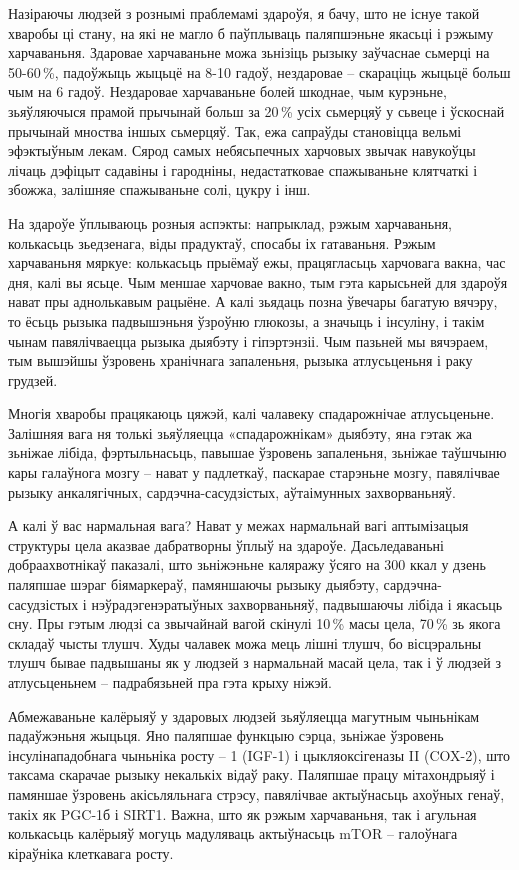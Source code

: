 Назіраючы людзей з рознымі праблемамі здароўя, я бачу, што не існуе такой хваробы ці стану, на які не магло б паўплываць паляпшэньне якасьці і рэжыму харчаваньня. Здаровае харчаваньне можа зьнізіць рызыку заўчаснае сьмерці на 50-60\,\%, падоўжыць жыцьцё на 8-10 гадоў, нездаровае – скараціць жыцьцё больш чым на 6 гадоў. Нездаровае харчаваньне болей шкоднае, чым курэньне, зьяўляючыся прамой прычынай больш за 20\,\% усіх сьмерцяў у сьвеце і ўскоснай прычынай мноства іншых сьмерцяў. Так, ежа сапраўды становіцца вельмі эфэктыўным лекам. Сярод самых небясьпечных харчовых звычак навукоўцы лічаць дэфіцыт садавіны і гародніны, недастатковае спажываньне клятчаткі і збожжа, залішняе спажываньне солі, цукру і інш.

На здароўе ўплываюць розныя аспэкты: напрыклад, рэжым харчаваньня, колькасьць зьедзенага, віды прадуктаў, спосабы іх гатаваньня. Рэжым харчаваньня мяркуе: колькасьць прыёмаў ежы, працягласьць харчовага вакна, час дня, калі вы ясьце. Чым меншае харчовае вакно, тым гэта карысьней для здароўя нават пры аднолькавым рацыёне. А калі зьядаць позна ўвечары багатую вячэру, то ёсьць рызыка падвышэньня ўзроўню глюкозы, а значыць і інсуліну, і такім чынам павялічваецца рызыка дыябэту і гіпэртэнзіі. Чым пазьней мы вячэраем, тым вышэйшы ўзровень хранічнага запаленьня, рызыка атлусьценьня і раку грудзей.

Многія хваробы працякаюць цяжэй, калі чалавеку спадарожнічае атлусьценьне. Залішняя вага ня толькі зьяўляецца «спадарожнікам» дыябэту, яна гэтак жа зьніжае лібіда, фэртыльнасьць, павышае ўзровень запаленьня, зьніжае таўшчыню кары галаўнога мозгу – нават у падлеткаў, паскарае старэньне мозгу, павялічвае рызыку анкалягічных, сардэчна-сасудзістых, аўтаімунных захворваньняў.

А калі ў вас нармальная вага? Нават у межах нармальнай вагі аптымізацыя структуры цела аказвае дабратворны ўплыў на здароўе. Дасьледаваньні добраахвотнікаў паказалі, што зьніжэньне каляражу ўсяго на 300 ккал у дзень паляпшае шэраг біямаркераў, памяншаючы рызыку дыябэту, сардэчна-сасудзістых і нэўрадэгенэратыўных захворваньняў, падвышаючы лібіда і якасьць сну. Пры гэтым людзі са звычайнай вагой скінулі 10\,\% масы цела, 70\,\% зь якога складаў чысты тлушч. Худы чалавек можа мець лішні тлушч, бо вісцэральны тлушч бывае падвышаны як у людзей з нармальнай масай цела, так і ў людзей з атлусьценьнем – падрабязьней пра гэта крыху ніжэй.

Абмежаваньне калёрыяў у здаровых людзей зьяўляецца магутным чыньнікам падаўжэньня жыцьця. Яно паляпшае функцыю сэрца, зьніжае ўзровень інсулінападобнага чыньніка росту – 1 (IGF-1) і цыкляоксігеназы II (COX-2), што таксама скарачае рызыку некалькіх відаў раку. Паляпшае працу мітахондрыяў і памяншае ўзровень акісьляльнага стрэсу, павялічвае актыўнасьць ахоўных генаў, такіх як PGC-1б і SIRT1. Важна, што як рэжым харчаваньня, так і агульная колькасьць калёрыяў могуць мадуляваць актыўнасьць mTOR – галоўнага кіраўніка клеткавага росту.

